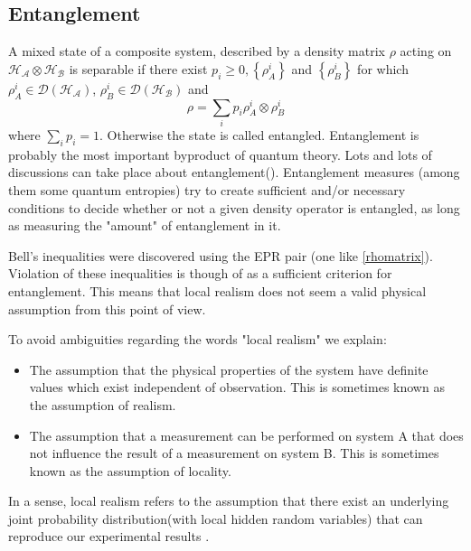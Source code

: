 \subsection{Entanglement}
A mixed state of a composite system, described by a density matrix $\rho$ acting on $\mathcal{H_{A}} \otimes \mathcal{H_{B}}$ is separable if there exist $p_{i} \geq 0,\left\{\rho_{A}^{i}\right\}$ and $\left\{\rho_{B}^{i}\right\}$ for which $\rho^{i}_A \in \mathcal{D}(\mathcal{H_A})$, $\rho^{i}_B \in \mathcal{D}(\mathcal{H_B})$
and
$$
\rho=\sum_{i} p_{i} \rho_{A}^{i} \otimes \rho_{B}^{i}
$$
where $\sum_{i} p_{i}=1$. Otherwise the state is called entangled. Entanglement is probably the most important byproduct of quantum theory. Lots and lots of discussions can take place about entanglement(\cite{horodecki2009quantum}). Entanglement measures (among them some quantum entropies) try to create sufficient and/or necessary conditions to decide whether or not a given density operator is entangled, as long as measuring the "amount" of entanglement in it.
\par 
Bell's inequalities were discovered using the EPR pair (one like \ref{rhomatrix}). Violation of these inequalities is though of as a sufficient criterion for entanglement. This means that local realism does not seem a valid physical assumption from this point of view.  
\par 
To avoid ambiguities regarding the words "local realism" we explain:
\begin{itemize}
\item The assumption that the physical properties of the system have definite values which exist independent of observation. This is sometimes known as the assumption of realism. 
\item The assumption that a measurement can be performed on system A that does not influence the result of a measurement on system B. This is sometimes known as the assumption of locality.
\end{itemize}
In a sense, local realism refers to the assumption that there exist an underlying joint probability distribution(with local hidden random variables) that can reproduce our experimental results \citep{cerf1997entropic}.